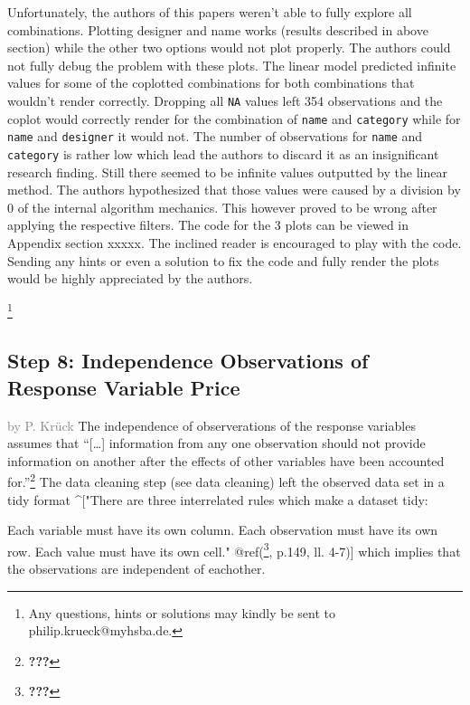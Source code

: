 \documentclass[a4paper, nobind]{templates/ociamthesis}
\begin{document}
Unfortunately, the authors of this papers weren't able to fully explore all combinations.
Plotting designer and name works (results described in above section) while the other two options would not plot properly.
The authors could not fully debug the problem with these plots.
The linear model predicted infinite values for some of the coplotted combinations for both combinations that wouldn't render correctly.
Dropping all \texttt{NA} values left 354 observations and the coplot would correctly render for the combination of \texttt{name} and \texttt{category} while for \texttt{name} and \texttt{designer} it would not. The number of observations for \texttt{name} and \texttt{category} is rather low which lead the authors to discard it as an insignificant research finding.
Still there seemed to be infinite values outputted by the linear method. The authors hypothesized that those values were caused by a division by 0 of the internal algorithm mechanics. This however proved to be wrong after applying the respective filters.
The code for the 3 plots can be viewed in Appendix section xxxxx.
The inclined reader is encouraged to play with the code. Sending any hints or even a solution to fix the code and fully render the plots would be highly appreciated by the authors.

\footnote{Any questions, hints or solutions may kindly be sent to philip.krueck@myhsba.de.}

\hypertarget{step-8-independence-observations-of-response-variable-price}{%
\subsection{Step 8: Independence Observations of Response Variable Price}\label{step-8-independence-observations-of-response-variable-price}}

\textcolor{gray}{by P. Krück}
The independence of observerations of the response variables assumes that ``{[}\ldots{}{]} information from any one observation should not provide information on another after the effects of other variables have been accounted for.''\footnote{{\textbf{???}}}
The data cleaning step (see data cleaning) left the observed data set in a tidy format \^{}{[}"There are three interrelated rules which make a dataset tidy:

Each variable must have its own column.
Each observation must have its own row.
Each value must have its own cell." @ref(\footnote{{\textbf{???}}}, p.149, ll. 4-7){]} which implies that the observations are independent of eachother.
\end{document}
